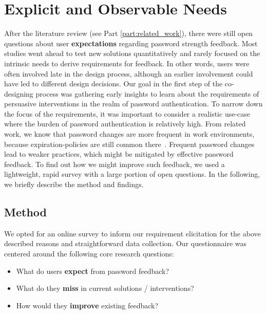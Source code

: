 \section{Explicit and Observable Needs}\label{sec:codesign:part1}
After the literature review (see Part \ref{part:related_work}), there were still open questions about user \textbf{expectations} regarding password strength feedback. Most studies went ahead to test new solutions quantitatively and rarely focused on the intrinsic needs to derive requirements for feedback. In other words, users were often involved late in the design process, although an earlier involvement could have led to different design decisions. Our goal in the first step of the co-designing process was gathering early insights to learn about the requirements of persuasive interventions in the realm of password authentication. 
%
To narrow down the focus of the requirements, it was important to consider a realistic use-case where the burden of password authentication is relatively high. From related work, we know that password changes are more frequent in work environments, because expiration-policies are still common there \cite{Inglesant2010TrueCostOfUnusablePolicies}. Frequent password changes lead to weaker practices, which might be mitigated by effective password feedback. To find out how we might improve such feedback, we used a lightweight, rapid survey with a large portion of open questions. In the following, we briefly describe the method and findings. 

\subsection{Method}
We opted for an online survey to inform our requirement elicitation for the above described reasons and straightforward data collection. Our questionnaire was centered around the following core research questions:
\begin{itemize}
	\item What do users \textbf{expect} from password feedback?
	\item What do they \textbf{miss} in current solutions / interventions?
	\item How would they \textbf{improve} existing feedback?
\end{itemize}

